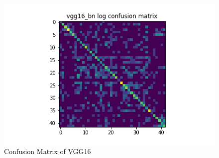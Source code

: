 \begin{figure}[H]
\begin{minipage}[b]{.5\linewidth}
  \end{minipage}
  \hfill
  \begin{minipage}[b]{.5\linewidth}
    \centering
    \includegraphics[width=1.2\textwidth]{figs/conf_matrix/vgg16_bn_log_conf.png}
  \end{minipage}

  \caption{Confusion Matrix of VGG16}
  \label{fig:vgg16_conf}
\end{figure}

